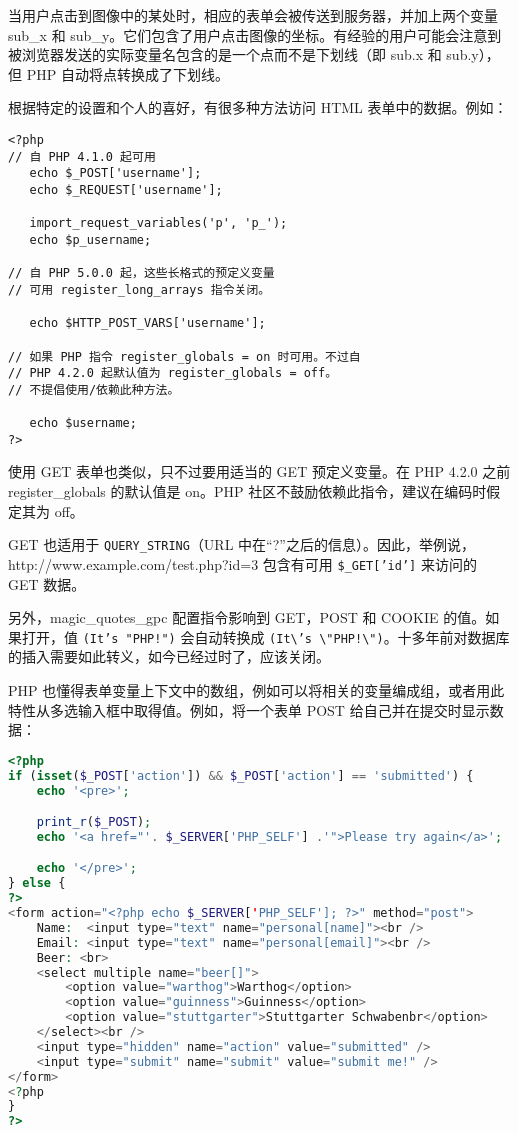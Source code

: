 当用户点击到图像中的某处时，相应的表单会被传送到服务器，并加上两个变量 sub\_x 和 sub\_y。它们包含了用户点击图像的坐标。有经验的用户可能会注意到被浏览器发送的实际变量名包含的是一个点而不是下划线（即 sub.x 和 sub.y），但 PHP 自动将点转换成了下划线。




根据特定的设置和个人的喜好，有很多种方法访问 HTML 表单中的数据。例如：

\begin{verbatim}
<?php
// 自 PHP 4.1.0 起可用
   echo $_POST['username'];
   echo $_REQUEST['username'];
   
   import_request_variables('p', 'p_');
   echo $p_username;

// 自 PHP 5.0.0 起，这些长格式的预定义变量
// 可用 register_long_arrays 指令关闭。

   echo $HTTP_POST_VARS['username'];

// 如果 PHP 指令 register_globals = on 时可用。不过自
// PHP 4.2.0 起默认值为 register_globals = off。
// 不提倡使用/依赖此种方法。

   echo $username;
?>
\end{verbatim}

使用 GET 表单也类似，只不过要用适当的 GET 预定义变量。在 PHP 4.2.0 之前 register\_globals 的默认值是 on。PHP 社区不鼓励依赖此指令，建议在编码时假定其为 off。


GET 也适用于 \texttt{QUERY\_STRING}（URL 中在“?”之后的信息）。因此，举例说，http://www.example.com/test.php?id=3 包含有可用 \texttt{\$\_GET['id']} 来访问的 GET 数据。

另外，magic\_quotes\_gpc 配置指令影响到 GET，POST 和 COOKIE 的值。如果打开，值 \texttt{(It's "PHP!")} 会自动转换成 \texttt{(It\textbackslash 's \textbackslash "PHP!\textbackslash ")}。十多年前对数据库的插入需要如此转义，如今已经过时了，应该关闭。


PHP 也懂得表单变量上下文中的数组，例如可以将相关的变量编成组，或者用此特性从多选输入框中取得值。例如，将一个表单 POST 给自己并在提交时显示数据：

\begin{lstlisting}[language=PHP]
<?php
if (isset($_POST['action']) && $_POST['action'] == 'submitted') {
    echo '<pre>';

    print_r($_POST);
    echo '<a href="'. $_SERVER['PHP_SELF'] .'">Please try again</a>';

    echo '</pre>';
} else {
?>
<form action="<?php echo $_SERVER['PHP_SELF']; ?>" method="post">
    Name:  <input type="text" name="personal[name]"><br />
    Email: <input type="text" name="personal[email]"><br />
    Beer: <br>
    <select multiple name="beer[]">
        <option value="warthog">Warthog</option>
        <option value="guinness">Guinness</option>
        <option value="stuttgarter">Stuttgarter Schwabenbr</option>
    </select><br />
    <input type="hidden" name="action" value="submitted" />
    <input type="submit" name="submit" value="submit me!" />
</form>
<?php
}
?>
\end{lstlisting}






